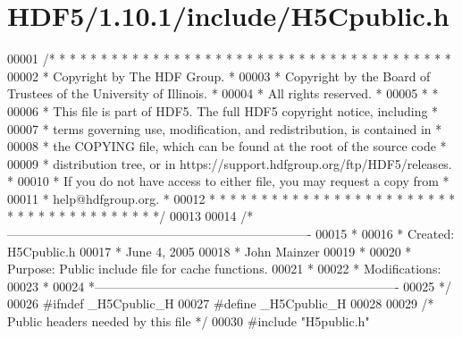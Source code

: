 \hypertarget{_h_d_f5_21_810_81_2include_2_h5_cpublic_8h_source}{}\section{H\+D\+F5/1.10.1/include/\+H5\+Cpublic.h}
\label{_h_d_f5_21_810_81_2include_2_h5_cpublic_8h_source}

\begin{DoxyCode}
00001 \textcolor{comment}{/* * * * * * * * * * * * * * * * * * * * * * * * * * * * * * * * * * * * * * *}
00002 \textcolor{comment}{ * Copyright by The HDF Group.                                               *}
00003 \textcolor{comment}{ * Copyright by the Board of Trustees of the University of Illinois.         *}
00004 \textcolor{comment}{ * All rights reserved.                                                      *}
00005 \textcolor{comment}{ *                                                                           *}
00006 \textcolor{comment}{ * This file is part of HDF5.  The full HDF5 copyright notice, including     *}
00007 \textcolor{comment}{ * terms governing use, modification, and redistribution, is contained in    *}
00008 \textcolor{comment}{ * the COPYING file, which can be found at the root of the source code       *}
00009 \textcolor{comment}{ * distribution tree, or in https://support.hdfgroup.org/ftp/HDF5/releases.  *}
00010 \textcolor{comment}{ * If you do not have access to either file, you may request a copy from     *}
00011 \textcolor{comment}{ * help@hdfgroup.org.                                                        *}
00012 \textcolor{comment}{ * * * * * * * * * * * * * * * * * * * * * * * * * * * * * * * * * * * * * * */}
00013 
00014 \textcolor{comment}{/*-------------------------------------------------------------------------}
00015 \textcolor{comment}{ *}
00016 \textcolor{comment}{ * Created: H5Cpublic.h}
00017 \textcolor{comment}{ *              June 4, 2005}
00018 \textcolor{comment}{ *              John Mainzer}
00019 \textcolor{comment}{ *}
00020 \textcolor{comment}{ * Purpose:     Public include file for cache functions.}
00021 \textcolor{comment}{ *}
00022 \textcolor{comment}{ * Modifications:}
00023 \textcolor{comment}{ *}
00024 \textcolor{comment}{ *-------------------------------------------------------------------------}
00025 \textcolor{comment}{ */}
00026 \textcolor{preprocessor}{#ifndef \_H5Cpublic\_H}
00027 \textcolor{preprocessor}{#define \_H5Cpublic\_H}
00028 
00029 \textcolor{comment}{/* Public headers needed by this file */}
00030 \textcolor{preprocessor}{#include "H5public.h"}

\end{DoxyCode}
